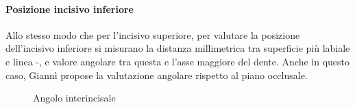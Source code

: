 \paragraph{Posizione incisivo inferiore}
Allo stesso modo che per l'incisivo superiore, per valutare la posizione dell'incisivo inferiore si misurano la distanza millimetrica tra superficie più labiale e linea -, e valore angolare tra questa e l'asse maggiore del dente. Anche in questo caso, Giannì propose la valutazione angolare rispetto al piano occlusale.

\begin{figure}[p!]
\centering
\begin{minipage}{.44\textwidth}
 \centering
 \caption{Angolo interincisale}
 \label{fig:steiner_interincisale}
\end{minipage}\quad\quad
\begin{minipage}{.44\textwidth}
 \centering

\end{minipage}
\end{figure}
